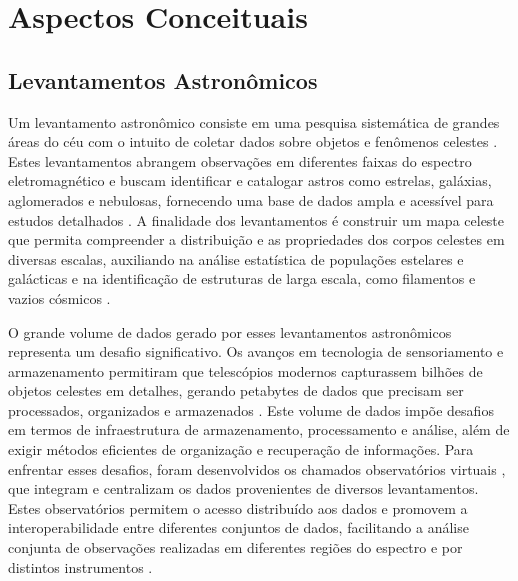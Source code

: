 \section{Aspectos Conceituais}
\label{cap:conceitos}




\subsection{Levantamentos Astronômicos}
\label{sec:surveys}
Um levantamento astronômico consiste em uma pesquisa sistemática de grandes áreas do céu com o intuito de coletar dados sobre objetos e fenômenos celestes \citep[p. 40-42]{extragalactic-astronomy-book}. Estes levantamentos abrangem observações em diferentes faixas do espectro eletromagnético e buscam identificar e catalogar astros como estrelas, galáxias, aglomerados e nebulosas, fornecendo uma base de dados ampla e acessível para estudos detalhados \citep{astronomical-survey}. A finalidade dos levantamentos é construir um mapa celeste que permita compreender a distribuição e as propriedades dos corpos celestes em diversas escalas, auxiliando na análise estatística de populações estelares e galácticas e na identificação de estruturas de larga escala, como filamentos e vazios cósmicos \citep{bahcall1995,baleisis1998,jarrett2004}.

O grande volume de dados gerado por esses levantamentos astronômicos representa um desafio significativo. Os avanços em tecnologia de sensoriamento e armazenamento permitiram que telescópios modernos capturassem bilhões de objetos celestes em detalhes, gerando petabytes de dados que precisam ser processados, organizados e armazenados \citep{szalay2000,graefe1993}. Este volume de dados impõe desafios em termos de infraestrutura de armazenamento, processamento e análise, além de exigir métodos eficientes de organização e recuperação de informações. Para enfrentar esses desafios, foram desenvolvidos os chamados observatórios virtuais \citep{ivoa}, que integram e centralizam os dados provenientes de diversos levantamentos. Estes observatórios permitem o acesso distribuído aos dados e promovem a interoperabilidade entre diferentes conjuntos de dados, facilitando a análise conjunta de observações realizadas em diferentes regiões do espectro e por distintos instrumentos \citep{sciserver}.

